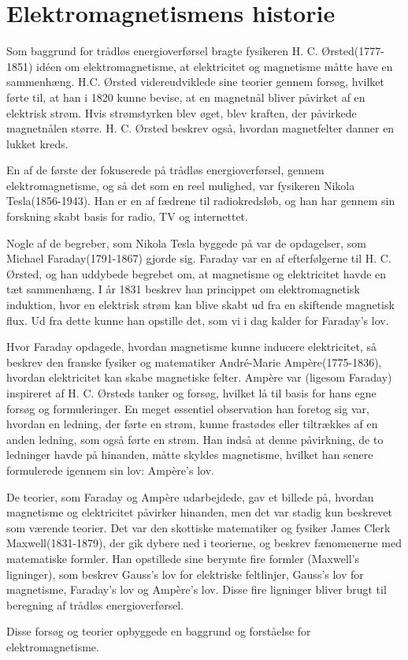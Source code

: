 \section{Elektromagnetismens historie}

Som baggrund for trådløs energioverførsel bragte fysikeren H. C. Ørsted(1777-1851) idéen om elektromagnetisme, at elektricitet og magnetisme måtte have en sammenhæng. H.C. Ørsted videreudviklede sine teorier gennem forsøg, hvilket førte til, at han i 1820 kunne bevise, at en magnetnål bliver påvirket af en elektrisk strøm. Hvis strømstyrken blev øget, blev kraften, der påvirkede magnetnålen større. H. C. Ørsted beskrev også, hvordan magnetfelter danner en lukket kreds.

En af de første der fokuserede på trådløs energioverførsel, gennem elektromagnetisme, og så det som en reel mulighed, var fysikeren Nikola Tesla(1856-1943). Han er en af fædrene til radiokredsløb, og han har gennem sin forskning skabt basis for radio, TV og internettet.

Nogle af de begreber, som Nikola Tesla byggede på var de opdagelser, som Michael Faraday(1791-1867) gjorde sig. Faraday var en af efterfølgerne til H. C. Ørsted, og han uddybede begrebet om, at magnetisme og elektricitet havde en tæt sammenhæng. I år 1831 beskrev han princippet om elektromagnetisk induktion, hvor en elektrisk strøm kan blive skabt ud fra en skiftende magnetisk flux. Ud fra dette kunne han opstille det, som vi i dag kalder for Faraday's lov.

Hvor Faraday opdagede, hvordan magnetisme kunne inducere elektricitet, så beskrev den franske fysiker og matematiker André-Marie Ampère(1775-1836), hvordan elektricitet kan skabe magnetiske felter. Ampère var (ligesom Faraday) inspireret af H. C. Ørsteds tanker og forsøg, hvilket lå til basis for hans egne forsøg og formuleringer. En meget essentiel observation han foretog sig var, hvordan en ledning, der førte en strøm, kunne frastødes eller tiltrækkes af en anden ledning, som også førte en strøm. Han indså at denne påvirkning, de to ledninger havde på hinanden, måtte skyldes magnetisme, hvilket han senere formulerede igennem sin lov: Ampère's lov.

De teorier, som Faraday og Ampère udarbejdede, gav et billede på, hvordan magnetisme og elektricitet påvirker hinanden, men det var stadig kun beskrevet som værende teorier. Det var den skottiske matematiker og fysiker James Clerk Maxwell(1831-1879), der gik dybere ned i teorierne, og beskrev fænomenerne med matematiske formler. Han opstillede sine berymte fire formler (Maxwell's ligninger), som beskrev Gauss's lov for elektriske feltlinjer, Gauss's lov for magnetisme, Faraday's lov og Ampère's lov. Disse fire ligninger bliver brugt til beregning af trådløs energioverførsel.

Disse forsøg og teorier opbyggede en baggrund og forståelse for elektromagnetisme.  
\newpage